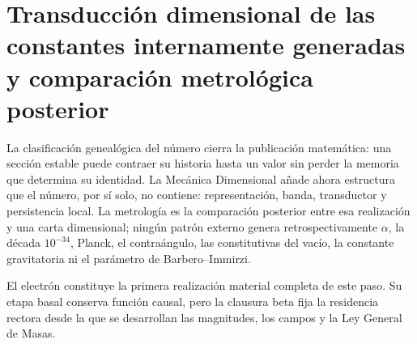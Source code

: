 \providecommand{\HMTParteIIIConstantesTransitionsRoot}{sections/transiciones_constantes}

\section{Transducción dimensional de las constantes internamente generadas y comparación metrológica posterior}

La clasificación genealógica del número cierra la publicación matemática: una sección estable puede contraer su historia hasta un valor sin perder la memoria que determina su identidad. La Mecánica Dimensional añade ahora estructura que el número, por sí solo, no contiene: representación, banda, transductor y persistencia local. La metrología es la comparación posterior entre esa realización y una carta dimensional; ningún patrón externo genera retrospectivamente \(\alpha\), la década \(10^{-34}\), Planck, el contraángulo, las constitutivas del vacío, la constante gravitatoria ni el parámetro de Barbero--Immirzi.



El electrón constituye la primera realización material completa de este paso. Su etapa basal conserva función causal, pero la clausura beta fija la residencia rectora desde la que se desarrollan las magnitudes, los campos y la Ley General de Masas.
